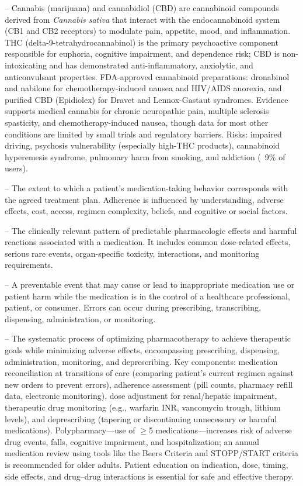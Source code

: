 -- Cannabis (marijuana) and cannabidiol (CBD) are cannabinoid compounds derived from \emph{Cannabis sativa} that interact with the endocannabinoid system (CB1 and CB2 receptors) to modulate pain, appetite, mood, and inflammation. THC (delta-9-tetrahydrocannabinol) is the primary psychoactive component responsible for euphoria, cognitive impairment, and dependence risk; CBD is non-intoxicating and has demonstrated anti-inflammatory, anxiolytic, and anticonvulsant properties. FDA-approved cannabinoid preparations: dronabinol and nabilone for chemotherapy-induced nausea and HIV/AIDS anorexia, and purified CBD (Epidiolex) for Dravet and Lennox-Gastaut syndromes. Evidence supports medical cannabis for chronic neuropathic pain, multiple sclerosis spasticity, and chemotherapy-induced nausea, though data for most other conditions are limited by small trials and regulatory barriers. Risks: impaired driving, psychosis vulnerability (especially high-THC products), cannabinoid hyperemesis syndrome, pulmonary harm from smoking, and addiction (~9\% of users).

-- The extent to which a patient’s medication-taking behavior corresponds with the agreed treatment plan. Adherence is influenced by understanding, adverse effects, cost, access, regimen complexity, beliefs, and cognitive or social factors.

-- The clinically relevant pattern of predictable pharmacologic effects and harmful reactions associated with a medication. It includes common dose-related effects, serious rare events, organ-specific toxicity, interactions, and monitoring requirements.

-- A preventable event that may cause or lead to inappropriate medication use or patient harm while the medication is in the control of a healthcare professional, patient, or consumer. Errors can occur during prescribing, transcribing, dispensing, administration, or monitoring.

-- The systematic process of optimizing pharmacotherapy to achieve therapeutic goals while minimizing adverse effects, encompassing prescribing, dispensing, administration, monitoring, and deprescribing. Key components: medication reconciliation at transitions of care (comparing patient's current regimen against new orders to prevent errors), adherence assessment (pill counts, pharmacy refill data, electronic monitoring), dose adjustment for renal/hepatic impairment, therapeutic drug monitoring (e.g., warfarin INR, vancomycin trough, lithium levels), and deprescribing (tapering or discontinuing unnecessary or harmful medications). Polypharmacy—use of $\ge$5 medications—increases risk of adverse drug events, falls, cognitive impairment, and hospitalization; an annual medication review using tools like the Beers Criteria and STOPP/START criteria is recommended for older adults. Patient education on indication, dose, timing, side effects, and drug--drug interactions is essential for safe and effective therapy.

